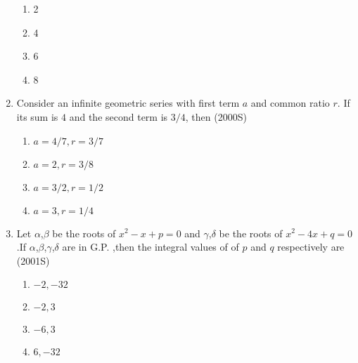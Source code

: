 \documentclass[journal]{IEEEtran}
\theoremstyle{remark}
\begin{document}
\begin{enumerate}
\begin{multicols}{4}
        
        \begin{enumerate}
            \item 2
            \item 4
            \item 6
            \item 8
        \end{enumerate}
        \end{multicols}
\item Consider an infinite geometric series with first term $a$ and common ratio $r$. If its sum is $4$ and the second term is $3/4$, then \hfill (2000S)
        \begin{multicols}{2}
        \begin{enumerate}
            \item $a=4/7,r=3/7$
            \item $a=2,r=3/8$
            \item $a=3/2,r=1/2$
            \item $a=3,r=1/4$
            \end{enumerate}
            \end{multicols}
\item Let $\alpha$,$\beta$ be the roots of $x^2-x+p=0$ and $\gamma$,$\delta$ be the roots of $x^2-4x+q=0$.If $\alpha$,$\beta$,$\gamma$,$\delta$ are in G.P. ,then the integral values of of $p$ and $q$ respectively are \hfill(2001S)
            \begin{multicols}{4}
            \begin{enumerate}
                \item $-2,-32$
                \item $-2,3$
                \item $-6,3$
                \item $6,-32$
        

\end{enumerate}
\end{multicols}
\end{enumerate}
\end{document}
